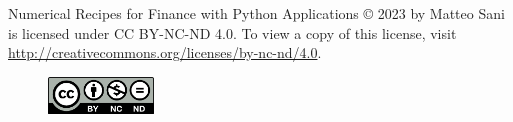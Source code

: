 \thispagestyle{empty}
\cleardoublepage\null
\vspace*{\fill}
\thispagestyle{empty}
Numerical Recipes for Finance with Python Applications © 2023 by Matteo Sani is licensed under CC BY-NC-ND 4.0. To view a copy of this license, visit \href{http://creativecommons.org/licenses/by-nc-nd/4.0}{http://creativecommons.org/licenses/by-nc-nd/4.0}.
\begin{figure}[!h]
\centering
\includegraphics[width=0.25\textwidth]{figures/by-nc-nd}
\end{figure}
\newpage
\thispagestyle{empty}
